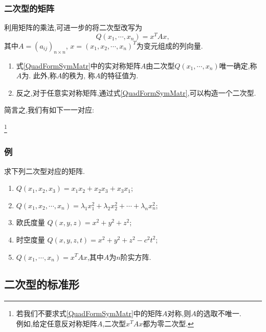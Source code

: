 \begin{frame}\frametitle{二次型的矩阵}
利用矩阵的乘法,可进一步的将二次型改写为
\begin{equation} \label{QuadFormSymMatr}
Q(x_1,\cdots,x_n)=x^TAx,
\end{equation}
\pp
其中$A=(a_{ij})_{n\times n}$, $x=(x_1,x_2,\cdots,x_n)^T$为变元组成的列向量.
\pp
\begin{proposition}[二次型的矩阵]
\begin{enumerate}
\item 式\eqref{QuadFormSymMatr}中的实对称矩阵$A$由二次型$Q(x_1,\cdots,x_n)$唯一确定,称$A$为.
\pp
此外,称$A$的秩为,
\pp
称$A$的特征值为.
\pp
\item 反之,对于任意实对称矩阵,通过式\eqref{QuadFormSymMatr},可以构造一个二次型.
\end{enumerate}
\end{proposition}
\pp
简言之,我们有如下一一对应:
\begin{center}
\footnote{若我们不要求式\eqref{QuadFormSymMatr}中的矩阵$A$对称,则$A$的选取不唯一.\\例如,给定任意反对称矩阵$A$,二次型$x^TAx$都为零二次型.}
\end{center}
\end{frame}






\begin{frame}\frametitle{例}

\begin{example}求下列二次型对应的矩阵.
\begin{enumerate}
\item $Q(x_1,x_2,x_3)=x_1x_2+x_2x_3+x_3x_1$;
\pp
\item $Q(x_1,x_2,\cdots,x_n)=\lambda_1x_1^2+\lambda_2x_2^2+\cdots+\lambda_nx_n^2$;
\pp
\item 欧氏度量 $Q(x,y,z)=x^2+y^2+z^2$;
\pp
\item 时空度量 $Q(x,y,z,t)=x^2+y^2+z^2-c^2t^2$;
\pp
\item $Q(x_1,\cdots,x_n)=x^TAx$,其中$A$为$n$阶实方阵.
\end{enumerate}
\end{example}

\end{frame}




\subsection{二次型的标准形}


